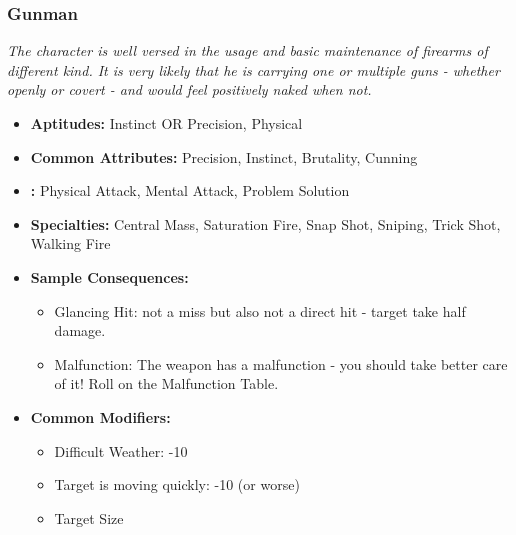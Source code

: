 	\subsubsection{Gunman}\label{Gunman}
		\textit{The character is well versed in the usage and basic maintenance of firearms of different kind.
		It is very likely that he is carrying one or multiple guns - whether openly or covert - and would feel positively naked when not.}
		\begin{itemize}
			\item \textbf{Aptitudes:} Instinct OR Precision, Physical
			\item \textbf{Common Attributes:} Precision, Instinct, Brutality, Cunning
			\item \textbf{:} Physical Attack, Mental Attack, Problem Solution
			\item \textbf{Specialties:} Central Mass, Saturation Fire, Snap Shot, Sniping, Trick Shot, Walking Fire
			\item \textbf{Sample Consequences:}
			\begin{itemize}
				\item Glancing Hit: not a miss but also not a direct hit - target take half damage.
				\item Malfunction: The weapon has a malfunction - you should take better care of it! Roll on the Malfunction Table.
			\end{itemize}
			\item \textbf{Common Modifiers:}
			\begin{itemize}
				\item Difficult Weather: -10
				\item Target is moving quickly: -10 (or worse)
				\item Target Size
			\end{itemize}
		\end{itemize}

